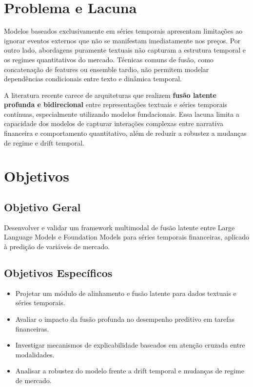 \documentclass[11pt, a4paper]{article}
\begin{document}
\section{Problema e Lacuna}

Modelos baseados exclusivamente em séries temporais apresentam limitações ao ignorar eventos externos que não se manifestam imediatamente nos preços. Por outro lado, abordagens puramente textuais não capturam a estrutura temporal e os regimes quantitativos do mercado. Técnicas comuns de fusão, como concatenação de features ou ensemble tardio, não permitem modelar dependências condicionais entre texto e dinâmica temporal.

A literatura recente carece de arquiteturas que realizem \textbf{fusão latente profunda e bidirecional} entre representações textuais e séries temporais contínuas, especialmente utilizando modelos fundacionais. Essa lacuna limita a capacidade dos modelos de capturar interações complexas entre narrativa financeira e comportamento quantitativo, além de reduzir a robustez a mudanças de regime e drift temporal.

\section{Objetivos}

\subsection{Objetivo Geral}

Desenvolver e validar um framework multimodal de fusão latente entre Large Language Models e Foundation Models para séries temporais financeiras, aplicado à predição de variáveis de mercado.

\subsection{Objetivos Específicos}

\begin{itemize}
    \item Projetar um módulo de alinhamento e fusão latente para dados textuais e séries temporais.
    \item Avaliar o impacto da fusão profunda no desempenho preditivo em tarefas financeiras.
    \item Investigar mecanismos de explicabilidade baseados em atenção cruzada entre modalidades.
    \item Analisar a robustez do modelo frente a drift temporal e mudanças de regime de mercado.
\end{itemize}
\end{document}
